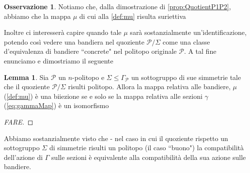 \documentclass[a4paper,12pt]{report}
\newcommand{\p}{\mathcal{P}}
\theoremstyle{plain}
\theoremstyle{definition}
\newtheorem{lem}[teo]{Lemma}
\newtheorem{oss}[teo]{Osservazione}
\begin{document}
\begin{oss}
Notiamo che, dalla dimostrazione di \ref{prop:QuotientP1P2}, abbiamo che la mappa $\mu$ di cui alla \ref{def:mu} risulta suriettiva
\end{oss}
Inoltre ci interesser\`a capire quando tale $\mu$ sar\`a sostanzialmente un'identificazione, potendo cos\`i vedere una bandiera nel quoziente
$\p/\Sigma$ come una classe d'equivalenza di bandiere ``concrete" nel politopo originale $\p$. A tal fine enunciamo e dimostriamo il seguente
\begin{lem}
\label{lem:QuotientFlags}
Sia $\p$ un $n$-politopo e $\Sigma\leq\Gamma_\p$ un sottogruppo di sue simmetrie tale che il quoziente $\p/\Sigma$ risulti politopo. Allora
la mappa relativa alle bandiere, $\mu$ (\ref{def:mu}) \`e una biiezione se e solo se la mappa relativa alle sezioni $\gamma$ (\ref{eq:gammaMap}) \`e
un isomorfismo
\end{lem}
\begin{proof}
[FARE]
\end{proof}
Abbiamo sostanzialmente visto che - nel caso in cui il quoziente rispetto un sottogruppo $\Sigma$ di simmetrie risulti un politopo (il caso ``buono")
la compatibilit\`a dell'azione di $\Gamma$ sulle sezioni \`e equivalente alla compatibilit\`a della sua azione sulle bandiere.
\end{document}
